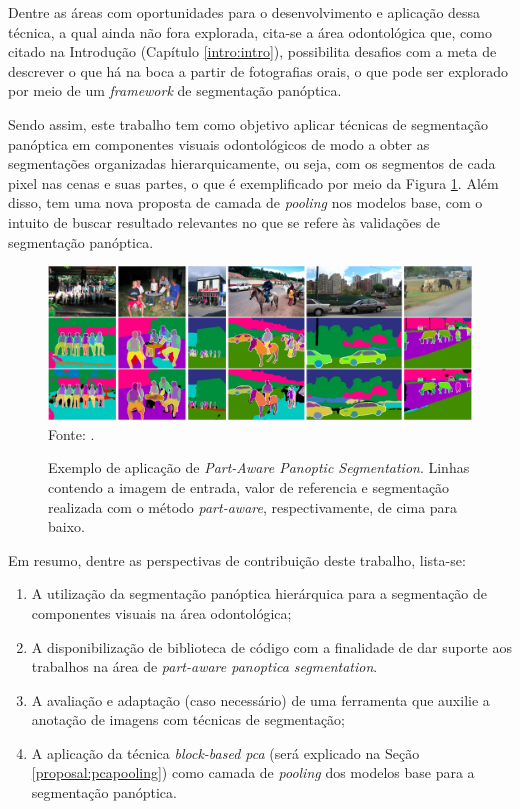 Dentre as áreas com oportunidades para o desenvolvimento e aplicação dessa técnica, a qual ainda não fora explorada, cita-se a área odontológica que, como citado na Introdução (Capítulo \ref{intro:intro}), possibilita desafios com a meta de descrever o que há na boca a partir de fotografias orais, o que pode ser explorado por meio de um \textit{framework} de segmentação panóptica.

Sendo assim, este trabalho tem como objetivo aplicar técnicas de segmentação panóptica em componentes visuais odontológicos de modo a obter as segmentações organizadas hierarquicamente, ou seja, com os segmentos de cada pixel nas cenas e suas partes, o que é exemplificado por meio da Figura \ref{proposal:proposal:fig:3}. Além disso, tem uma nova proposta de camada de \textit{pooling} nos modelos base, com o intuito de buscar resultado relevantes no que se refere às validações de segmentação panóptica.

\begin{figure}[H]
    \centering
    \caption{Exemplo de aplicação de \textit{Part-Aware Panoptic Segmentation}. Linhas contendo a imagem de entrada, valor de referencia e segmentação realizada com o método \textit{part-aware}, respectivamente, de cima para baixo.}
    \includegraphics[width=1\linewidth]{recursos/imagens/proposal/part-aware-example.png}
    \label{proposal:proposal:fig:3}
    Fonte: \cite{DeGeus2021}.
\end{figure}

Em resumo, dentre as perspectivas de contribuição deste trabalho, lista-se:

\begin{enumerate}[I]
  \item A utilização da segmentação panóptica hierárquica para a segmentação de componentes visuais na área odontológica;
  \item A disponibilização de biblioteca de código com a finalidade de dar suporte aos trabalhos na área de \textit{part-aware panoptica segmentation}.
  \item A avaliação e adaptação (caso necessário) de uma ferramenta que auxilie a anotação de imagens com técnicas de segmentação;
  \item A aplicação da técnica \textit{block-based pca} \cite{Salvadeo2011} (será explicado na Seção \ref{proposal:pcapooling}) como camada de \textit{pooling} dos modelos base para a segmentação panóptica.
\end{enumerate}

